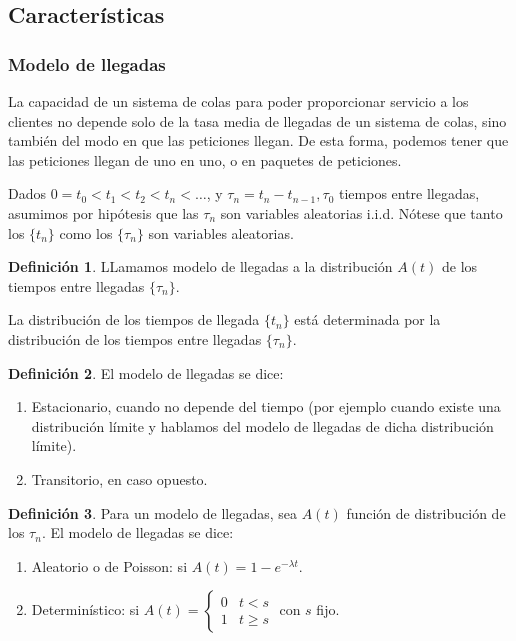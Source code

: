 \documentclass[a4paper,10pt]{scrartcl}
\theoremstyle{definition}
\newtheorem*{mydef}{Definición}
\numberwithin{equation}{section}
\begin{document}
\subsection{Características}
\subsubsection{Modelo de llegadas}
La capacidad de un sistema de colas para poder proporcionar servicio a los clientes no depende solo de la tasa media
de llegadas de un sistema de colas, sino también del modo en que las peticiones llegan. De esta forma, podemos
tener que las peticiones llegan de uno en uno, o en paquetes de peticiones.

Dados $0=t_0 < t_1 < t_2 < t_n < \ldots$, y $\tau_n = t_n - t_{n-1}, \tau_0$ tiempos entre llegadas, asumimos por hipótesis
que las $\tau_n$ son variables aleatorias i.i.d. Nótese que tanto los $\{t_n\}$ como los $\{\tau_n\}$ son
variables aleatorias.

\begin{mydef}
LLamamos modelo de llegadas a la distribución $A(t)$ de los tiempos entre llegadas $\{\tau_n\}$.
\end{mydef}
 
 La distribución de los tiempos de llegada $\{t_n\}$ está determinada por la distribución de los tiempos entre
 llegadas $\{\tau_n\}$. 
 
\begin{mydef}
El modelo de llegadas se dice:
 
 \begin{enumerate}
   \item Estacionario, cuando no depende del tiempo (por ejemplo cuando existe una distribución límite y hablamos
   del modelo de llegadas de dicha distribución límite).
   \item Transitorio, en caso opuesto.
 \end{enumerate}
\end{mydef}

 
\begin{mydef}
 Para un modelo de llegadas, sea $A(t)$ función de distribución de los $\tau_n$. 
 El modelo de llegadas se dice:

  \begin{enumerate}
  \item Aleatorio o de Poisson: si $A(t) = 1 - e^{-\lambda t}$.
  \item Determinístico: si $A(t) = \left\{\begin{array}{ll}
					0 & t<s \\
					1 & t\ge s
					\end{array}\right.$ con $s$ fijo.
  
  \end{enumerate}
\end{mydef}
\end{document}
